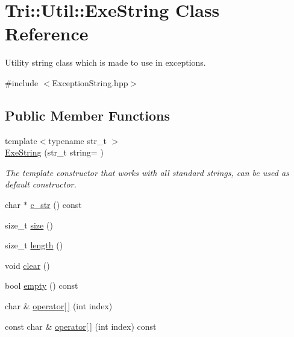 \hypertarget{class_tri_1_1_util_1_1_exe_string}{}\section{Tri\+:\+:Util\+:\+:Exe\+String Class Reference}
\label{class_tri_1_1_util_1_1_exe_string}


Utility string class which is made to use in exceptions.  




{\ttfamily \#include $<$Exception\+String.\+hpp$>$}

\subsection*{Public Member Functions}
\begin{DoxyCompactItemize}
\item 
{\footnotesize template$<$typename str\+\_\+t $>$ }\\\hyperlink{class_tri_1_1_util_1_1_exe_string_aa67d55b0493a2ae32bde3b0f70a14b27}{Exe\+String} (str\+\_\+t string= \textquotesingle{}\textquotesingle{})
\begin{DoxyCompactList}\small\item\em The template constructor that works with all standard strings, can be used as default constructor. \end{DoxyCompactList}\item 
char $\ast$ \hyperlink{class_tri_1_1_util_1_1_exe_string_a2220749d7d3267fcc6a06d7bbf36f378}{c\+\_\+str} () const 
\item 
size\+\_\+t \hyperlink{class_tri_1_1_util_1_1_exe_string_a17dd50d7ccb08da9a8cbfd8f98ffc895}{size} ()
\item 
size\+\_\+t \hyperlink{class_tri_1_1_util_1_1_exe_string_a4f712868da4242729dd516a3faf7e7e9}{length} ()
\item 
void \hyperlink{class_tri_1_1_util_1_1_exe_string_a952ccaa4565fbffe19bbc5bdf79b325a}{clear} ()
\item 
bool \hyperlink{class_tri_1_1_util_1_1_exe_string_a9179cc740ca8787e3147e6c4a7d7bafd}{empty} () const 
\item 
char \& \hyperlink{class_tri_1_1_util_1_1_exe_string_a2e9b34e189f041291dc788b3a7d32647}{operator\mbox{[}$\,$\mbox{]}} (int index)
\item 
const char \& \hyperlink{class_tri_1_1_util_1_1_exe_string_aa3f5dc18bf612f1f6f1fea1f3b8ca1e9}{operator\mbox{[}$\,$\mbox{]}} (int index) const 

\end{DoxyCompactItemize}
